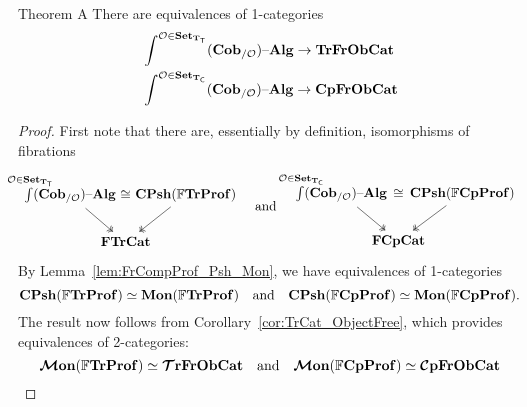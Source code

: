 \documentclass[11pt,oneside,article]{memoir}
\begin{document}
\begin{named}{Theorem A}
      \label{thm:TheoremA}
  There are equivalences of 1-categories
  \begin{align*}
     &\int^{\mathcal{O}\in\mathbf{Set}_{\mathbf{T}_{\mathsf{T}}}}(\mathbf{Cob}_{/\mathcal{O}}){\text \textendash}\mathbf{Alg} \to \mathbf{TrFrObCat}
     \\
     &\int^{\mathcal{O}\in\mathbf{Set}_{\mathbf{T}_{\mathsf{C}}}}(\mathbf{Cob}_{/\mathcal{O}}){\text \textendash}\mathbf{Alg} \to \mathbf{CpFrObCat}
  \end{align*}
\end{named}
\begin{proof}
   First note that there are, essentially by definition, isomorphisms of fibrations
   \begin{equation*}
      \begin{tikzcd}[column sep=-2em]
         \int\limits^{\mathclap{\LabSet\in\Set_{\TT}}}(\LCob{\LabSet})\alg
               \ar[rr,phantom,"\iso"] \ar[dr,two heads]
            && \CPsh(\dFrTrProf) \ar[dl,two heads] \\
         & \FrTrCat &
      \end{tikzcd}
      \quad\text{and}\quad
      \begin{tikzcd}[column sep=-2em]
         \int\limits^{\mathclap{\LabSet\in\Set_{\TC}}}(\LCob{\LabSet})\alg
               \ar[rr,phantom,"\iso"] \ar[dr,two heads]
            && \CPsh(\dFrCompProf) \ar[dl,two heads] \\
         & \FrCompCat &
      \end{tikzcd}
   \end{equation*}
   By Lemma~\ref{lem:FrCompProf_Psh_Mon}, we have equivalences of 1-categories
   \begin{equation}
      \mathbf{CPsh}(\mathbb{F}\mathbf{TrProf})\simeq\mathbf{Mon}(\mathbb{F}\mathbf{TrProf})
      \quad\text{and}\quad
      \mathbf{CPsh}(\mathbb{F}\mathbf{CpProf})\simeq\mathbf{Mon}(\mathbb{F}\mathbf{CpProf}).
   \end{equation}
   The result now follows from Corollary~\ref{cor:TrCat_ObjectFree}, which provides equivalences of
   2-categories:
   \[
      \bm{\mathcal{M}}\mathbf{on}(\mathbb{F}\mathbf{TrProf})\simeq\bm{\mathcal{T}}\mathbf{rFrObCat}
      \quad\text{and}\quad
      \bm{\mathcal{M}}\mathbf{on}(\mathbb{F}\mathbf{CpProf})\simeq\bm{\mathcal{C}}\mathbf{pFrObCat}
   \]
\end{proof}
\end{document}
